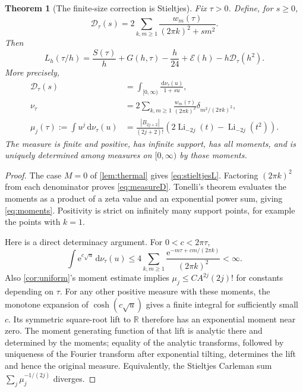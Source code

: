\documentclass[11pt,a4paper]{article}
\newcommand{\ee}{\mathrm e}
\newcommand{\dd}{\,\mathrm d}
\newcommand{\Li}{\operatorname{Li}}
\newcommand{\E}{\mathcal E}
\newcommand{\D}{\mathcal D}
\newcommand{\R}{\mathbb R}
\numberwithin{equation}{section}
\theoremstyle{plain}
\newtheorem{theorem}{Theorem}[section]
\theoremstyle{definition}
\theoremstyle{remark}
\begin{document}
\begin{theorem}[The finite-size correction is Stieltjes]
\label{thm:stieltjes}
Fix $\tau>0$. Define, for $s\ge0$,
\begin{equation}
 \D_\tau(s)=2\sum_{k,m\ge1}\frac{w_m(\tau)}{(2\pi k)^2+s m^2}.
 \label{eq:D}
\end{equation}
Then
\begin{equation}
 L_h(\tau/h)=\frac{S(\tau)}h+G(h,\tau)-\frac h{24}
               +\E(h)-h\D_\tau(h^2).
 \label{eq:stieltjesL}
\end{equation}
More precisely,
\begin{align}
 \D_\tau(s)&=\int_{[0,\infty)}\frac{\dd\nu_\tau(u)}{1+su},\label{eq:measureD}\\
 \nu_\tau&=2\sum_{k,m\ge1}\frac{w_m(\tau)}{(2\pi k)^2}
                     \delta_{m^2/(2\pi k)^2},\label{eq:measure}\\
 \mu_j(\tau):=\int u^j\dd\nu_\tau(u)
 &=\frac{|B_{2j+2}|}{(2j+2)!}
       \left(2\Li_{-2j}(t)-\Li_{-2j}(t^2)\right).\label{eq:moments}
\end{align}
The measure is finite and positive, has infinite support, has all moments,
and is uniquely determined among measures on $[0,\infty)$ by those moments.
\end{theorem}
\begin{proof}
The case $M=0$ of \cref{lem:thermal} gives \eqref{eq:stieltjesL}. Factoring
$(2\pi k)^2$ from each denominator proves \eqref{eq:measureD}. Tonelli's
theorem evaluates the moments as a product of a zeta value and an exponential
power sum, giving \eqref{eq:moments}. Positivity is strict on infinitely many
support points, for example the points with $k=1$.

Here is a direct determinacy argument. For $0<c<2\pi\tau$,
\begin{equation}
 \int\ee^{c\sqrt u}\dd\nu_\tau(u)
 \le 4\sum_{k,m\ge1}\frac{\ee^{-m\tau+cm/(2\pi k)}}{(2\pi k)^2}<\infty.
 \label{eq:expsqrt}
\end{equation}
Also \cref{cor:uniform}'s moment estimate implies
$\mu_j\le C A^{2j}(2j)!$ for constants depending on $\tau$.
For any other positive measure with these moments, the monotone expansion of
$\cosh(c\sqrt u)$ gives a finite integral for sufficiently small $c$.
Its symmetric square-root lift to $\R$ therefore has an exponential moment
near zero. The moment generating function of that lift is analytic there
and determined by the moments; equality of the analytic transforms, followed
by uniqueness of the Fourier transform after exponential tilting, determines
the lift and hence the original measure. Equivalently, the Stieltjes
Carleman sum $\sum_j\mu_j^{-1/(2j)}$ diverges.
\end{proof}
\end{document}
